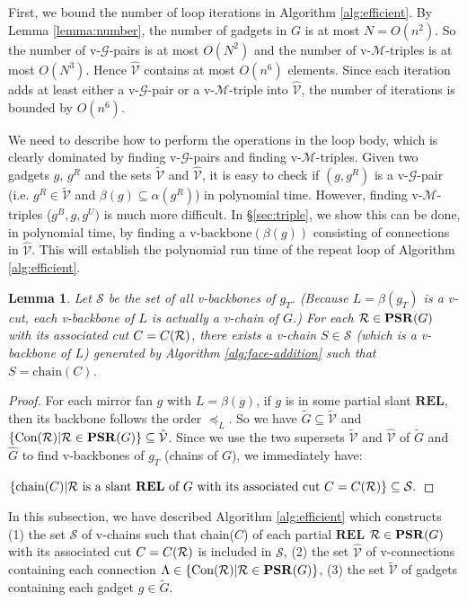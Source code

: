 \documentclass[11pt]{article}
\newcommand{\R}{{\cal R}}
\newcommand{\MM}{\mathcal{M}}
\newcommand{\GG}{\mathcal{G}}
\newcommand{\VV}{\mathcal{V}}
\newcommand{\SSS}{\mathcal{S}}
\newcommand{\CON}{\mbox{Con}}
\newcommand{\REL}{\mathbf{REL}}
\newcommand{\PSR}{\mathbf{PSR}}
\newtheorem{lemma}[figure]{Lemma}
\begin{document}
First, we bound the number of loop iterations in Algorithm \ref{alg:efficient}.
By Lemma \ref{lemma:number}, the number of gadgets in $G$ is at most
$N=O(n^2)$. So the number of v-$\GG$-pairs is at most $O(N^2)$ and the
number of v-$\MM$-triples is at most $O(N^3)$. Hence $\hat{\VV}$ contains
at most $O(n^6)$ elements. Since each iteration adds at least either
a v-$\GG$-pair or a v-$\MM$-triple into $\hat{\VV}$, the number of
iterations is bounded by $O(n^6)$.

We need to describe how to perform the operations in the loop body,
which is clearly dominated by finding v-$\GG$-pairs and
finding v-$\MM$-triples. Given two gadgets $g$, $g^R$ and the sets
$\tilde{\VV}$ and $\hat{\VV}$, it is easy to check if $(g,g^R)$
is a v-$\GG$-pair (i.e. $g^R \in \tilde{\VV}$ and $\beta(g)\subseteq \alpha(g^R)$)
in polynomial time. However,
finding v-$\MM$-triples ($g^B,g,g^U)$ is
much more difficult. In \S \ref{sec:triple}, we show this can be done,
in polynomial time, by finding a v-$\mbox{backbone}(\beta(g))$ consisting of
connections in $\hat{\VV}$. This will establish the polynomial run time of
the repeat loop of Algorithm \ref{alg:efficient}.
\begin{lemma}\label{lemma:sufficient}
Let $\SSS$ be the set of all v-backbones of $g_T$.
(Because $L=\beta(g_T)$ is a v-cut,
each v-backbone of $L$ is actually a v-chain of $G$.)
For each $\R\in \PSR(G)$ with its associated cut $C=C(\R)$,
there exists a v-chain $S\in \SSS$ (which is a v-backbone
of $L$) generated by Algorithm \ref{alg:face-addition}
such that $S=\mbox{chain}(C)$.
\end{lemma}

\begin{proof}
For each mirror fan $g$ with $L=\beta(g)$,
if $g$ is in some partial slant $\REL$,
then its backbone follows the order $\preceq_L$.
So we have $\tilde{G} \subseteq \tilde{\VV}$ and
$\{\CON(\R)|\R\in \PSR(G)\} \subseteq \hat{\VV}$.
Since we use the two supersets $\tilde{\VV}$ and $\hat{\VV}$
of $\tilde{G}$ and $\hat{G}$ to find v-backbones of $g_T$ (chains of $G$),
we immediately have:

$\{\mbox{chain}(C)|\R \mbox{ is a slant } \REL
\mbox{ of } G \mbox{ with } \mbox{its } \mbox{associated } \mbox{cut }
C=C(\R)\} \subseteq \SSS.$
\end{proof}


In this subsection, we have described Algorithm \ref{alg:efficient}
which constructs
(1) the set $\SSS$ of v-chains such that
chain($C$) of each partial $\REL$ $\R\in \PSR(G)$ with its
associated cut $C=C(\R)$ is included in $\SSS$,
(2) the set $\hat{\VV}$ of v-connections containing
each connection $\Lambda \in \{\CON(\R)|\R\in \PSR(G)\}$,
(3) the set $\tilde{\VV}$ of gadgets containing
each gadget $g\in \tilde{G}$.
\end{document}
